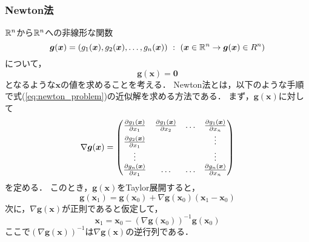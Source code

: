 \subsubsection{Newton法}
$\mathbb{R}^n$から$\mathbb{R}^n$への非線形な関数
\begin{equation}
    \bm{g}(\bm{x}) = \left(g_1(\bm{x}), g_2(\bm{x}), \dots, g_n(\bm{x})\right) \ : \ (\bm{x} \in \mathbb{R}^n \rightarrow \bm{g}(\bm{x}) \in R^n)
\end{equation}
について，
\begin{equation}
    \label{eq:newton_problem}
    \bm{g}(\bm{x}) = \bm{0}
\end{equation}
となるような$\bm{x}$の値を求めることを考える．
Newton法とは，以下のような手順で式(\ref{eq:newton_problem})の近似解を求める方法である．
まず，$\bm{g}(\bm{x})$に対して
\begin{equation}
    \nabla\bm{g}(\bm{x}) = \begin{pmatrix}
        \frac{\partial g_1(\bm{x})}{\partial x_1} & \frac{\partial g_1(\bm{x})}{\partial x_2} & \dots & \frac{\partial g_1(\bm{x})}{\partial x_n} \\
        \frac{\partial g_2(\bm{x})}{\partial x_1} &  & & \vdots \\
        \vdots & & & \vdots\\
        \frac{\partial g_n(\bm{x})}{\partial x_1} & \dots & \dots & \frac{\partial g_n(\bm{x})}{\partial x_n}
    \end{pmatrix}
\end{equation}
を定める．
このとき，$\bm{g}(\bm{x})$をTaylor展開すると，
\begin{equation}
    \label{eq:tyalor_newton}
    \bm{g}(\bm{x}_1) = \bm{g}(\bm{x}_0) + \nabla\bm{g}(\bm{x}_0)(\bm{x}_1- \bm{x}_0)
\end{equation}
次に，$\nabla\bm{g}(\bm{x})$が正則であると仮定して，
\begin{equation}
    \bm{x}_1 = \bm{x}_0 - \left(\nabla\bm{g}(\bm{x}_0)\right)^{-1}\bm{g}(\bm{x}_0)
\end{equation}
ここで$\left(\nabla\bm{g}(\bm{x})\right)^{-1}$は$\nabla\bm{g}(\bm{x})$の逆行列である．

